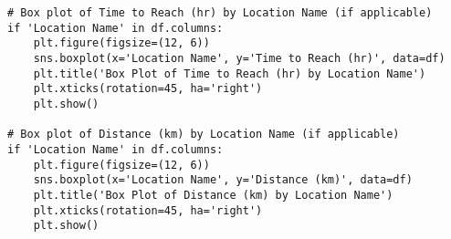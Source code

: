 \documentclass{article}
\begin{document}
\begin{verbatim}
# Box plot of Time to Reach (hr) by Location Name (if applicable)
if 'Location Name' in df.columns:
    plt.figure(figsize=(12, 6))
    sns.boxplot(x='Location Name', y='Time to Reach (hr)', data=df)
    plt.title('Box Plot of Time to Reach (hr) by Location Name')
    plt.xticks(rotation=45, ha='right')
    plt.show()

# Box plot of Distance (km) by Location Name (if applicable)
if 'Location Name' in df.columns:
    plt.figure(figsize=(12, 6))
    sns.boxplot(x='Location Name', y='Distance (km)', data=df)
    plt.title('Box Plot of Distance (km) by Location Name')
    plt.xticks(rotation=45, ha='right')
    plt.show()
\end{verbatim}
\end{document}
